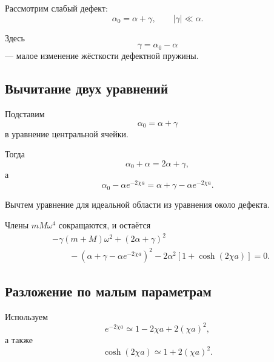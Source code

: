 \documentclass[../final.tex]{subfiles}
\begin{document}
Рассмотрим слабый дефект:
%
\begin{equation*}
    \alpha_0
    =
    \alpha+\gamma,
    \qquad
    |\gamma|\ll\alpha.
\end{equation*}
%

Здесь
%
\begin{equation*}
    \gamma
    =
    \alpha_0-\alpha
\end{equation*}
%
--- малое изменение жёсткости дефектной пружины.



\subsection*{Вычитание двух уравнений}

Подставим
%
\begin{equation*}
    \alpha_0
    =
    \alpha+\gamma
\end{equation*}
%
в уравнение центральной ячейки.

Тогда
%
\begin{equation*}
    \alpha_0+\alpha
    =
    2\alpha+\gamma,
\end{equation*}
%
а
%
\begin{equation*}
    \alpha_0-\alpha e^{-2\chi a}
    =
    \alpha+\gamma-\alpha e^{-2\chi a}.
\end{equation*}
%

Вычтем уравнение для идеальной области
из уравнения около дефекта.

Члены $mM\omega^4$ сокращаются, и остаётся
%
\begin{align*}
    &
    -\gamma(m+M)\omega^2
    +
    (2\alpha+\gamma)^2
    \\
    &\qquad
    -
    \left(
        \alpha+\gamma-\alpha e^{-2\chi a}
    \right)^2
    -
    2\alpha^2
    \left[
        1+\cosh(2\chi a)
    \right]
    =
    0.
\end{align*}



\subsection*{Разложение по малым параметрам}

Используем
%
\begin{equation*}
    e^{-2\chi a}
    \simeq
    1
    -
    2\chi a
    +
    2(\chi a)^2,
\end{equation*}
%
а также
%
\begin{equation*}
    \cosh(2\chi a)
    \simeq
    1
    +
    2(\chi a)^2.
\end{equation*}
%
\end{document}
